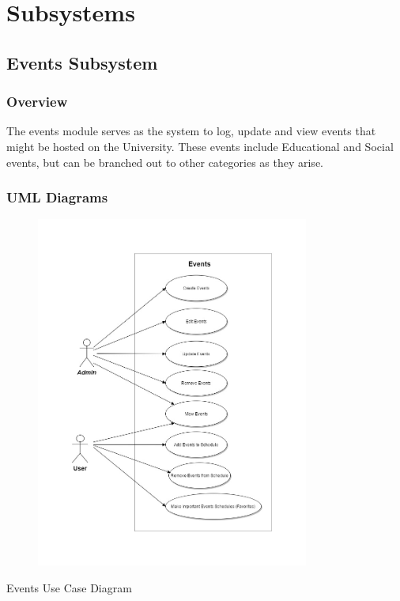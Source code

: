 \documentclass{article}
\begin{document}
    \section{Subsystems}
    
    \subsection{Events Subsystem}
    
    \subsubsection{Overview}
    
    The events module serves as the system to log, update and view events that might be hosted on the University. These events include Educational and Social events, but can be branched out to other categories as they arise.
    
    \subsubsection{UML Diagrams}
    
    \begin{figure}[h!]
        \includegraphics[width=0.8\textwidth]{Images/EventUC.jpg}
    \end{figure}
    Events Use Case Diagram
    
\end{document}
